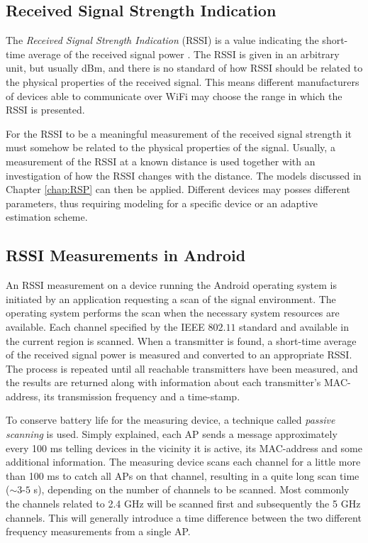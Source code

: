 \documentclass{LTHthesis}
\begin{document}
\subsection{Received Signal Strength Indication}
%
The \emph{Received Signal Strength Indication} (RSSI) is a value indicating the short-time average of the received signal power \cite{fig_fra10}. The RSSI is given in an arbitrary unit, but usually dBm, and there is no standard of how RSSI should be related to the physical properties of the received signal. This means different manufacturers of devices able to communicate over WiFi may choose the range in which the RSSI is presented. 

For the RSSI to be a meaningful measurement of the received signal strength it must somehow be related to the physical properties of the signal. Usually, a measurement of the RSSI at a known distance is used together with an investigation of how the RSSI changes with the distance. The models discussed in Chapter \ref{chap:RSP} can then be applied. Different devices may posses different parameters, thus requiring modeling for a specific device or an adaptive estimation scheme. 
%

\subsection{RSSI Measurements in Android}

An RSSI measurement on a device running the Android operating system is initiated by an application requesting a scan of the signal environment. The operating system performs the scan when the necessary system resources are available. Each channel specified by the IEEE $802.11$ standard and available in the current region is scanned. When a transmitter is found, a short-time average of the received signal power is measured and converted to an appropriate RSSI. The process is repeated until all reachable transmitters have been measured, and the results are returned along with information about each transmitter's MAC-address, its transmission frequency and a time-stamp. 

To conserve battery life for the measuring device, a technique called \emph{passive scanning} is used. Simply explained, each AP sends a message approximately every 100 ms telling devices in the vicinity it is active, its MAC-address and some additional information. The measuring device scans each channel for a little more than 100 ms to catch all APs on that channel, resulting in a quite long scan time ($\sim 3$-$5$ s), depending on the number of channels to be scanned. Most commonly the channels related to 2.4 GHz will be scanned first and subsequently the 5 GHz channels. This will generally introduce a time difference between the two different frequency measurements from a single AP.
\end{document}
